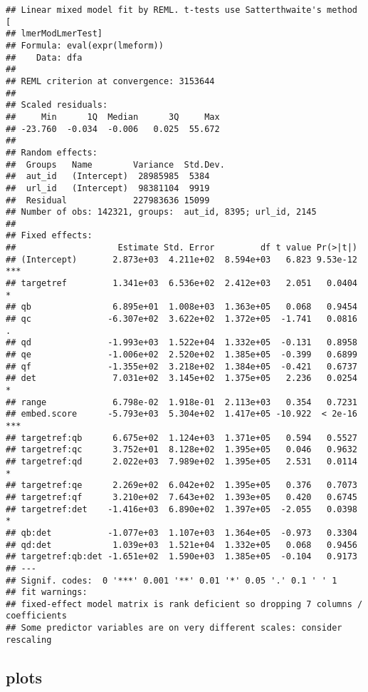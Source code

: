 \documentclass[
  12pt,
  oneside]{book}
\begin{document}
\begin{verbatim}
## Linear mixed model fit by REML. t-tests use Satterthwaite's method [
## lmerModLmerTest]
## Formula: eval(expr(lmeform))
##    Data: dfa
## 
## REML criterion at convergence: 3153644
## 
## Scaled residuals: 
##     Min      1Q  Median      3Q     Max 
## -23.760  -0.034  -0.006   0.025  55.672 
## 
## Random effects:
##  Groups   Name        Variance  Std.Dev.
##  aut_id   (Intercept)  28985985  5384   
##  url_id   (Intercept)  98381104  9919   
##  Residual             227983636 15099   
## Number of obs: 142321, groups:  aut_id, 8395; url_id, 2145
## 
## Fixed effects:
##                    Estimate Std. Error         df t value Pr(>|t|)    
## (Intercept)       2.873e+03  4.211e+02  8.594e+03   6.823 9.53e-12 ***
## targetref         1.341e+03  6.536e+02  2.412e+03   2.051   0.0404 *  
## qb                6.895e+01  1.008e+03  1.363e+05   0.068   0.9454    
## qc               -6.307e+02  3.622e+02  1.372e+05  -1.741   0.0816 .  
## qd               -1.993e+03  1.522e+04  1.332e+05  -0.131   0.8958    
## qe               -1.006e+02  2.520e+02  1.385e+05  -0.399   0.6899    
## qf               -1.355e+02  3.218e+02  1.384e+05  -0.421   0.6737    
## det               7.031e+02  3.145e+02  1.375e+05   2.236   0.0254 *  
## range             6.798e-02  1.918e-01  2.113e+03   0.354   0.7231    
## embed.score      -5.793e+03  5.304e+02  1.417e+05 -10.922  < 2e-16 ***
## targetref:qb      6.675e+02  1.124e+03  1.371e+05   0.594   0.5527    
## targetref:qc      3.752e+01  8.128e+02  1.395e+05   0.046   0.9632    
## targetref:qd      2.022e+03  7.989e+02  1.395e+05   2.531   0.0114 *  
## targetref:qe      2.269e+02  6.042e+02  1.395e+05   0.376   0.7073    
## targetref:qf      3.210e+02  7.643e+02  1.393e+05   0.420   0.6745    
## targetref:det    -1.416e+03  6.890e+02  1.397e+05  -2.055   0.0398 *  
## qb:det           -1.077e+03  1.107e+03  1.364e+05  -0.973   0.3304    
## qd:det            1.039e+03  1.521e+04  1.332e+05   0.068   0.9456    
## targetref:qb:det -1.651e+02  1.590e+03  1.385e+05  -0.104   0.9173    
## ---
## Signif. codes:  0 '***' 0.001 '**' 0.01 '*' 0.05 '.' 0.1 ' ' 1
## fit warnings:
## fixed-effect model matrix is rank deficient so dropping 7 columns / coefficients
## Some predictor variables are on very different scales: consider rescaling
\end{verbatim}

\subsection{plots}\label{plots-1}
\end{document}
